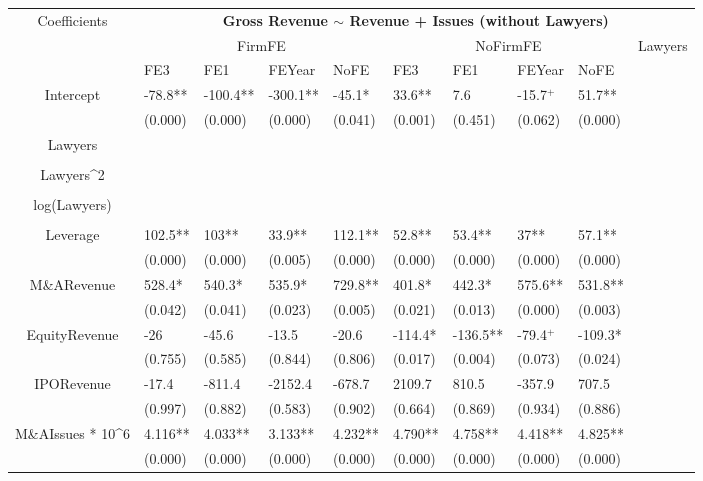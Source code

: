 \documentclass{article}
\begin{document}
\begin{table}[H]
\centering
\begin{tabular}{|clllllllll|}
\hline
\multirow{3}{*}{Coefficients} & \multicolumn{9}{c|}{\textbf{Gross Revenue $\sim$ Revenue + Issues (without Lawyers)}} \\
\cline{2-10}
& \multicolumn{4}{c}{FirmFE} & \multicolumn{4}{c}{NoFirmFE} & \multirow{2}{*}{Lawyers} \\
\cline{2-9}
& FE3 & FE1 & FEYear & NoFE & FE3 & FE1 & FEYear & NoFE &  \\
\hline
 
Intercept & -78.8** & -100.4** & -300.1** & -45.1* & 33.6** & 7.6 & -15.7$^{+}$ & 51.7** & \\ 
   & (0.000) & (0.000) & (0.000) & (0.041) & (0.001) & (0.451) & (0.062) & (0.000) & \\ 
  Lawyers &  &  &  &  &  &  &  &  & \\ 
   &  &  &  &  &  &  &  &  & \\ 
  Lawyers^2 &  &  &  &  &  &  &  &  & \\ 
   &  &  &  &  &  &  &  &  & \\ 
  log(Lawyers) &  &  &  &  &  &  &  &  & \\ 
   &  &  &  &  &  &  &  &  & \\ 
  Leverage & 102.5** & 103** & 33.9** & 112.1** & 52.8** & 53.4** & 37** & 57.1** & \\ 
   & (0.000) & (0.000) & (0.005) & (0.000) & (0.000) & (0.000) & (0.000) & (0.000) & \\ 
  M\&ARevenue & 528.4* & 540.3* & 535.9* & 729.8** & 401.8* & 442.3* & 575.6** & 531.8** & \\ 
   & (0.042) & (0.041) & (0.023) & (0.005) & (0.021) & (0.013) & (0.000) & (0.003) & \\ 
  EquityRevenue & -26 & -45.6 & -13.5 & -20.6 & -114.4* & -136.5** & -79.4$^{+}$ & -109.3* & \\ 
   & (0.755) & (0.585) & (0.844) & (0.806) & (0.017) & (0.004) & (0.073) & (0.024) & \\ 
  IPORevenue & -17.4 & -811.4 & -2152.4 & -678.7 & 2109.7 & 810.5 & -357.9 & 707.5 & \\ 
   & (0.997) & (0.882) & (0.583) & (0.902) & (0.664) & (0.869) & (0.934) & (0.886) & \\ 
  M\&AIssues * 10^6 & 4.116** & 4.033** & 3.133** & 4.232** & 4.790** & 4.758** & 4.418** & 4.825** & \\ 
   & (0.000) & (0.000) & (0.000) & (0.000) & (0.000) & (0.000) & (0.000) & (0.000) & \\ 

\end{tabular}
\end{table}
\end{document}
